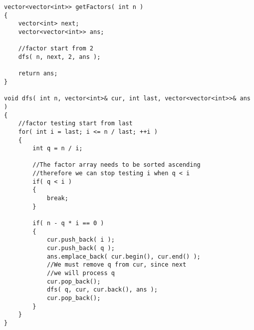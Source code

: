 \setcounter{lstlisting}{0}
\begin{lstlisting}[style=customc, caption={DFS}]
vector<vector<int>> getFactors( int n )
{
    vector<int> next;
    vector<vector<int>> ans;

    //factor start from 2
    dfs( n, next, 2, ans );

    return ans;
}

void dfs( int n, vector<int>& cur, int last, vector<vector<int>>& ans )
{
    //factor testing start from last
    for( int i = last; i <= n / last; ++i )
    {
        int q = n / i;

        //The factor array needs to be sorted ascending
        //therefore we can stop testing i when q < i
        if( q < i )
        {
            break;
        }

        if( n - q * i == 0 )
        {
            cur.push_back( i );
            cur.push_back( q );
            ans.emplace_back( cur.begin(), cur.end() );
            //We must remove q from cur, since next
            //we will process q
            cur.pop_back();
            dfs( q, cur, cur.back(), ans );
            cur.pop_back();
        }
    }
}
\end{lstlisting}
